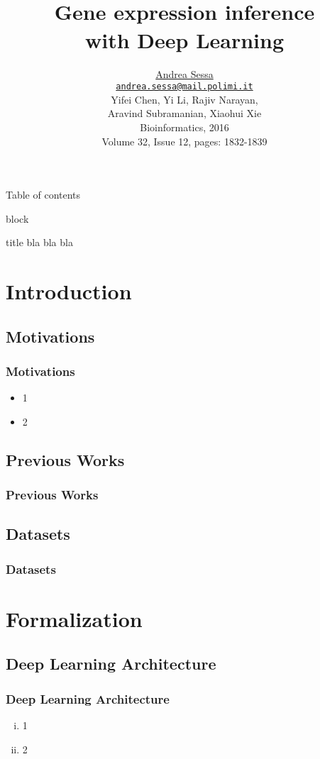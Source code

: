 \documentclass[professionalfont]{beamer}
\title[Gene expression inference with Deep Learning]{\textbf{\\Gene expression inference\\ with Deep Learning}}
\author[A. Sessa]{\underline{Andrea Sessa}\\
\vspace{2mm}
{\small \href{mailto:andrea.sessa@mail.polimi.it}{\nolinkurl{andrea.sessa@mail.polimi.it}}}\\
 \small{Yifei Chen, Yi Li, Rajiv Narayan, \\ Aravind Subramanian, Xiaohui Xie} \\
 \small{Bioinformatics, 2016 \\ Volume 32, Issue 12, pages: 1832-1839}}
\date{}
\begin{document}
\begin{frame}[plain]
\titlepage
\end{frame}

\begin{frame}{Table of contents}
\tableofcontents
\end{frame}

\begin{frame}{block}
\begin{block}{title}
bla bla bla
\end{block}
\end{frame}

\section{Introduction}

\subsection{Motivations}
\begin{frame}
\frametitle{Motivations}
\begin{itemize}
\item 1
\item 2
\end{itemize}
\end{frame}

\subsection{Previous Works}
\begin{frame}
\frametitle{Previous Works}
\end{frame}

\subsection{Datasets}
\begin{frame}
\frametitle{Datasets}
\end{frame}

\section{Formalization}

\subsection{Deep Learning Architecture}
\begin{frame}
\frametitle{Deep Learning Architecture}
\begin{enumerate}[i)]
\item 1
\item 2
\end{enumerate}
\end{frame}
\end{document}
